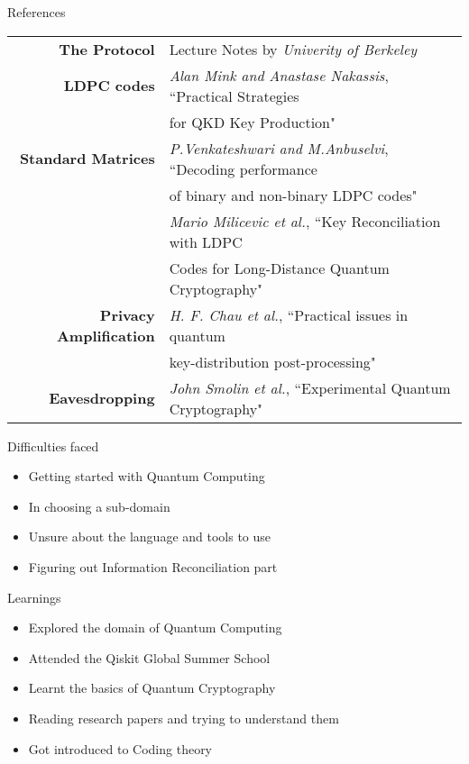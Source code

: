 \documentclass{beamer}
\begin{document}
\begin{frame}{References}
    \begin{tabular}{r l}
        \footnotesize{\textbf{The Protocol}} & \footnotesize{Lecture Notes by \emph{Univerity of Berkeley}} \\
            \footnotesize{\textbf{LDPC codes}} & \footnotesize{\emph{Alan Mink and Anastase Nakassis}}, \footnotesize{``Practical Strategies} \\
             & \footnotesize{for QKD Key Production"} \\
            \footnotesize{\textbf{Standard Matrices}} & \footnotesize{\emph{P.Venkateshwari and M.Anbuselvi}, ``Decoding performance} \\ 
             & \footnotesize{of binary and non-binary LDPC codes"} \\
             & \footnotesize{\emph{Mario Milicevic et al.}, ``Key Reconciliation with LDPC} \\ 
              & \footnotesize{Codes for Long-Distance Quantum Cryptography"} \\
            \footnotesize{\textbf{Privacy Amplification}} & \footnotesize{\emph{H. F. Chau et al.}, ``Practical issues in quantum} \\ 
              & \footnotesize{key-distribution post-processing"} \\
            \footnotesize{\textbf{Eavesdropping}} & \footnotesize{\emph{John Smolin et al.}, ``Experimental Quantum Cryptography"} \\
    \end{tabular}
\end{frame}
    

\begin{frame}{Difficulties faced}
	\begin{itemize}
		\item Getting started with Quantum Computing
        \item In choosing a sub-domain
        \item Unsure about the language and tools to use
		\item Figuring out Information Reconciliation part
	\end{itemize}
\end{frame}


\begin{frame}{Learnings}
	\begin{itemize}
		\item Explored the domain of Quantum Computing
        \item Attended the Qiskit Global Summer School
		\item Learnt the basics of Quantum Cryptography
		\item Reading research papers and trying to understand them
		\item Got introduced to Coding theory
	\end{itemize}
\end{frame}
\end{document}
